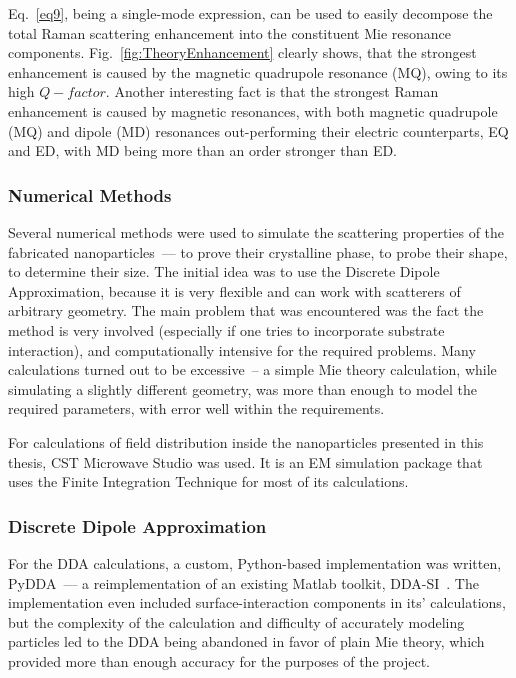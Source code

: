         Eq.~\ref{eq9}, being a single-mode expression, can be used to easily decompose the total Raman scattering enhancement into the constituent
        Mie resonance components. Fig.~\ref{fig:TheoryEnhancement} clearly shows, that the strongest enhancement is caused by the magnetic quadrupole
        resonance (MQ), owing to its high $Q-factor$. Another interesting fact is that the strongest Raman enhancement is caused by magnetic resonances,
        with both magnetic quadrupole (MQ) and dipole (MD) resonances out-performing their electric counterparts, EQ and ED, with MD being more than an
        order stronger than ED.

    \subsubsection{Numerical Methods}
    \label{sec:Numeric}
        Several numerical methods were used to simulate the scattering properties of the fabricated nanoparticles~--- to prove their
        crystalline phase, to probe their shape, to determine their size. The initial idea was to use the Discrete Dipole Approximation,
        because it is very flexible and can work with scatterers of arbitrary geometry. The main problem that was encountered was the fact
        the method is very involved (especially if one tries to incorporate substrate interaction), and computationally intensive for
        the required problems. Many calculations turned out to be excessive~-- a simple Mie theory calculation,
        while simulating a slightly different geometry, was more than enough to model the required parameters, with error well within the
        requirements.

        For calculations of field distribution inside the nanoparticles presented in this thesis, CST Microwave Studio was used.
        It is an  EM simulation package that uses the Finite Integration Technique for most of its calculations.

        \subsubsection{Discrete Dipole Approximation}
        \label{subsec:DDA}

                For the DDA calculations, a custom, Python-based implementation was written, PyDDA~--- a reimplementation of an existing
            Matlab toolkit, DDA-SI~\cite{loke2011discrete}. The implementation even included surface-interaction components in its' calculations,
            but the complexity of the calculation and difficulty of accurately modeling particles led to the DDA being abandoned in favor of plain
            Mie theory, which provided more than enough accuracy for the purposes of the project.

